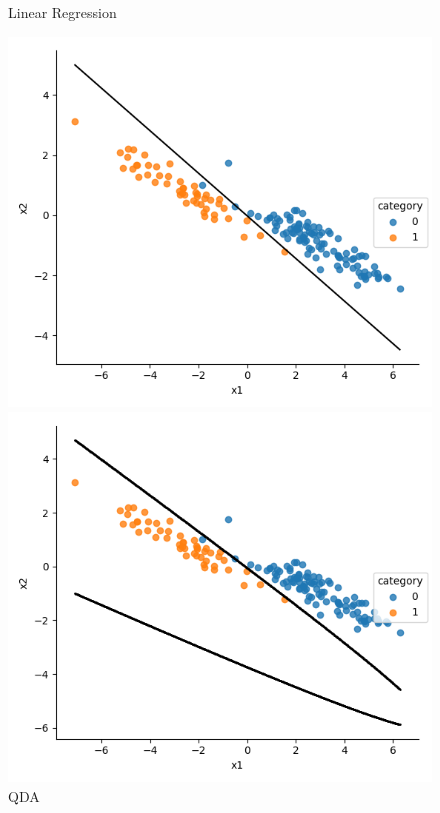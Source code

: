 \documentclass[a4paper]{article}
\begin{document}
\begin{figure}[h]
\begin{minipage}{0,45\textwidth}
\end{minipage}
\begin{minipage}{0,45\textwidth}
\caption{Linear Regression}
\includegraphics[scale=.45]{a_lr.png}
\end{minipage}
\begin{minipage}{0,45\textwidth}
\caption{QDA}
\includegraphics[scale=.45]{a_qda.png}
\end{minipage}
\end{figure}
\end{document}
